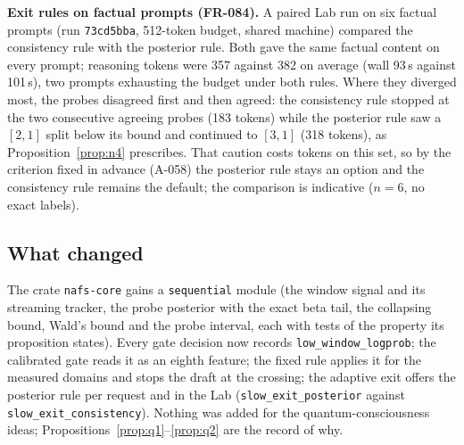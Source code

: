 \textbf{Exit rules on factual prompts (FR-084).} A paired Lab run on six factual
prompts (run \texttt{73cd5bba}, 512-token budget, shared machine) compared the
consistency rule with the posterior rule. Both gave the same factual content on
every prompt; reasoning tokens were 357 against 382 on average (wall 93\,s
against 101\,s), two prompts exhausting the budget under both rules. Where they
diverged most, the probes disagreed first and then agreed: the consistency rule
stopped at the two consecutive agreeing probes (183 tokens) while the posterior
rule saw a $[2,1]$ split below its bound and continued to $[3,1]$ (318 tokens),
as Proposition~\ref{prop:n4} prescribes. That caution costs tokens on this set,
so by the criterion fixed in advance (A-058) the posterior rule stays an option
and the consistency rule remains the default; the comparison is indicative
($n=6$, no exact labels).


\subsection{What changed}

The crate \texttt{nafs-core} gains a \texttt{sequential} module (the window signal and
its streaming tracker, the probe posterior with the exact beta tail, the
collapsing bound, Wald's bound and the probe interval, each with tests of the
property its proposition states). Every gate decision now records
\texttt{low\_window\_logprob}; the calibrated gate reads it as an eighth feature; the
fixed rule applies it for the measured domains and stops the draft at the
crossing; the adaptive exit offers the posterior rule per request and in the Lab
(\texttt{slow\_exit\_posterior} against \texttt{slow\_exit\_consistency}). Nothing was
added for the quantum-consciousness ideas; Propositions~\ref{prop:q1}--\ref{prop:q2}
are the record of why.
